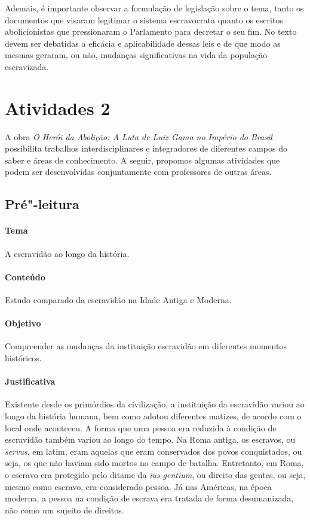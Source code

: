 \documentclass[12pt]{extarticle}
\begin{document}
Ademais, é importante observar a formulação de legislação sobre o tema, tanto
os documentos que visaram legitimar o sistema escravocrata quanto os escritos abolicionistas
que pressionaram o Parlamento para decretar o seu fim. No texto devem ser debatidas
a eficácia e aplicabilidade dessas leis e de que modo as mesmas geraram, ou não,
mudanças significativas na vida da população escravizada.

\section{Atividades 2}

A obra \emph{O Herói da Abolição: A Luta de Luiz Gama no Império do
Brasil} possibilita trabalhos interdisciplinares e integradores de
diferentes campos do saber e áreas de conhecimento. A seguir, propomos
algumas atividades que podem ser desenvolvidas conjuntamente com
professores de outras áreas. 



\subsection{Pré"-leitura}


\paragraph{Tema} A escravidão ao longo da história.

\paragraph{Conteúdo} Estudo comparado da escravidão na Idade Antiga e Moderna.

\paragraph{Objetivo} Compreender as mudanças da instituição
escravidão em diferentes momentos históricos.

\paragraph{Justificativa}  Existente desde os primórdios da civilização, a instituição
da escravidão variou ao longo da história humana, bem como adotou
diferentes matizes, de acordo com o local onde aconteceu. A forma que
uma pessoa era reduzida à condição de escravidão também variou ao longo
do tempo. Na Roma antiga, os escravos, ou \emph{servus}, em latim, eram
aquelas que eram conservados dos povos conquistados, ou seja, os
que não haviam sido mortos no campo de batalha. Entretanto, em Roma, o
escravo era protegido pelo ditame da \emph{ius gentium}, ou direito das
gentes, ou seja, mesmo como escravo, era considerado pessoa. Já nas
Américas, na época moderna, a pessoa na condição de escrava era tratada 
de forma desumanizada, não como um sujeito de direitos. 
\end{document}
